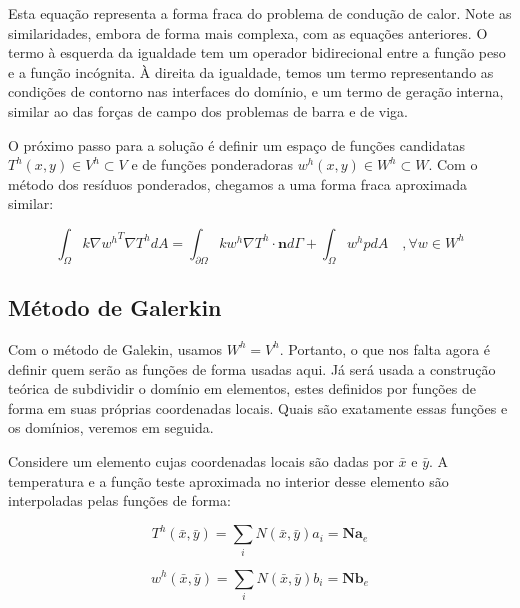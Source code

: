         Esta equação representa a forma fraca do problema de condução de calor. Note as similaridades, embora de forma mais complexa, com as equações anteriores. O termo à esquerda da igualdade tem um operador bidirecional entre a função peso e a função incógnita. À direita da igualdade, temos um termo representando as condições de contorno nas interfaces do domínio, e um termo de geração interna, similar ao das forças de campo dos problemas de barra e de viga.

        O próximo passo para a solução é definir um espaço de funções candidatas $T^h(x,y) \in V^h \subset V$ e de funções ponderadoras $w^h(x,y) \in W^h \subset W$. Com o método dos resíduos ponderados, chegamos a uma forma fraca aproximada similar:

        \begin{equation}
            \int_\Omega k \nabla {w^h}^T \nabla T^h  dA = 
            \int_{\partial \Omega} k w^h\nabla T^h \cdot \mathbf{n} d\Gamma
             + \int_\Omega w^h p dA \quad ,\forall w \in W^h
             \label{eq:calor_fraca_aprox}
        \end{equation}


    \subsection{Método de Galerkin}

        Com o método de Galekin, usamos $W^h = V^h$. Portanto, o que nos falta agora é definir quem serão as funções de forma usadas aqui. Já será usada a construção teórica de subdividir o domínio em elementos, estes definidos por funções de forma em suas próprias coordenadas locais. Quais são exatamente essas funções e os domínios, veremos em seguida.

        Considere um elemento cujas coordenadas locais são dadas por $\bar{x}$ e $\bar{y}$. A temperatura e a função teste aproximada no interior desse elemento são interpoladas pelas funções de forma:

        \begin{equation}
            T^h(\bar{x},\bar{y}) = \sum_i N(\bar{x},\bar{y}) a_i = \mathbf{N} \mathbf{a}_e
        \end{equation}

        \begin{equation}
            w^h(\bar{x},\bar{y}) = \sum_i N(\bar{x},\bar{y}) b_i = \mathbf{N} \mathbf{b}_e
        \end{equation}

